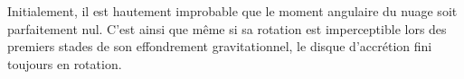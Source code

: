 Initialement, il est hautement improbable que le moment angulaire du nuage soit parfaitement nul. C'est ainsi que même si sa rotation est imperceptible lors des premiers stades de son effondrement gravitationnel, le disque d'accrétion fini toujours en rotation. 

%
%
%
%
%

